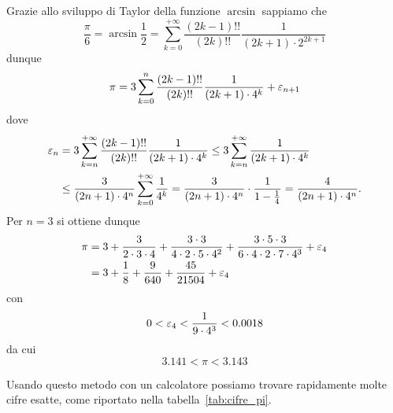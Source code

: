 \begin{exercise}
  \label{ex:cifre_pi}
  Grazie allo sviluppo di Taylor della funzione $\arcsin$
  sappiamo che
  \[
    \frac \pi 6
    = \arcsin \frac 1 2
    = \sum_{k=0}^{+\infty} \frac{(2k-1)!!}{(2k)!!} \frac{1}{(2k+1)\cdot 2^{2k+1}}
  \]
  dunque
  \[
    \pi = 3 \sum_{k=0}^n \frac{(2k-1)!!}{(2k)!!} \frac{1}{(2k+1)\cdot 4^k} + \varepsilon_{n+1}
  \]
  dove
  \begin{align*}
   \varepsilon_n
   &= 3 \sum_{k=n}^{+\infty} \frac{(2k-1)!!}{(2k)!!} \frac{1}{(2k+1)\cdot 4^k}
   \le 3 \sum_{k=n}^{+\infty} \frac{1}{(2k+1)\cdot 4^k} \\
   &\le \frac{3}{(2n+1)\cdot 4^n} \sum_{k=0}^{+\infty} \frac{1}{4^k}
   = \frac{3}{(2n+1)\cdot 4^n} \cdot \frac{1}{1-\frac 1 4}
   = \frac{4}{(2n+1)\cdot 4^n}.
 \end{align*}
 Per $n=3$ si ottiene dunque
 \begin{align*}
  \pi
  &= 3 + \frac{3}{2\cdot 3 \cdot 4} + \frac{3\cdot 3}{4\cdot 2 \cdot 5 \cdot 4^2}
  + \frac{3\cdot 5\cdot 3}{6\cdot 4\cdot 2 \cdot 7 \cdot 4^3} + \varepsilon_4 \\
  &= 3+\frac{1}{8} + \frac{9}{640} + \frac{45}{21504} + \varepsilon_4
\end{align*}
 con
 \[
 0 < \varepsilon_4 < \frac{1}{9\cdot 4^3} < 0.0018
 \]
 da cui
 \[
   3.141 < \pi < 3.143
 \]

 Usando questo metodo con un calcolatore possiamo trovare rapidamente molte
 cifre esatte, come riportato nella tabella~\ref{tab:cifre_pi}.
\end{exercise}
%
